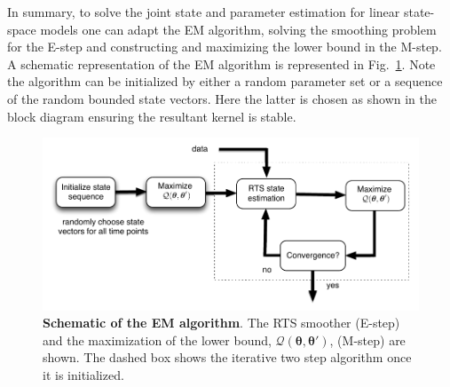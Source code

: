 \documentclass[review,authoryear,3p]{elsarticle}
\begin{document}
In summary, to solve the joint state and parameter estimation for linear state-space models one can adapt the EM algorithm, solving the smoothing problem for the E-step and constructing and maximizing the lower bound in the M-step. A schematic representation of the EM algorithm is represented in Fig.~\ref{fig:EMBlockDiagram}. Note the algorithm can be initialized by either a random parameter set or a sequence of the random bounded state vectors. Here the latter is chosen as shown in the block diagram ensuring the resultant kernel is stable.  
\begin{figure}[!t]
\centering
\includegraphics[scale=1]{./Graph/fig6.pdf}
\caption{{\bf Schematic of the EM algorithm}. The RTS smoother (E-step) and the maximization of the lower bound, $\mathcal Q(\boldsymbol \theta,\boldsymbol\theta')$, (M-step) are shown. The dashed box shows the iterative two step algorithm once it is initialized.}
\label{fig:EMBlockDiagram}
\end{figure}
\end{document}
